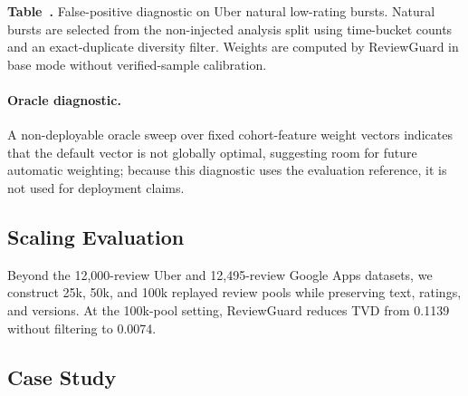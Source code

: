 \documentclass[runningheads]{llncs}
\begin{document}
\begin{center}
\small
{}
\textbf{Table~\thetable.} False-positive diagnostic on Uber natural low-rating bursts. Natural bursts are selected from the non-injected analysis split using time-bucket counts and an exact-duplicate diversity filter. Weights are computed by ReviewGuard in base mode without verified-sample calibration.
\label{tab:natural_burst_false_positive}
\medskip
{}
\end{center}

\paragraph{Oracle diagnostic.}
A non-deployable oracle sweep over fixed cohort-feature weight vectors indicates that the default vector is not globally optimal, suggesting room for future automatic weighting; because this diagnostic uses the evaluation reference, it is not used for deployment claims.



\subsection{Scaling Evaluation}

Beyond the 12,000-review Uber and 12,495-review Google Apps datasets, we construct 25k, 50k, and 100k replayed review pools while preserving text, ratings, and versions. At the 100k-pool setting, ReviewGuard reduces TVD from 0.1139 without filtering to 0.0074.

\subsection{Case Study}
\end{document}
